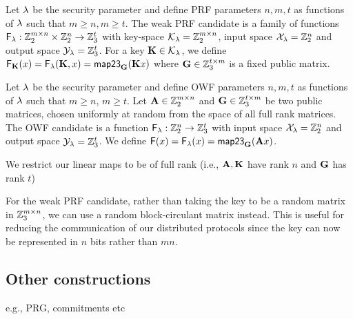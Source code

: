 \begin{construction}
Let $\lambda$ be the security parameter and define PRF parameters $n, m, t$ as functions of $\lambda$ such that $m \geq n, m \geq t$. The weak PRF candidate is a family of functions $\mathsf{F}_\lambda : \mathbb{Z}_2^{m \times n} \times \mathbb{Z}_2^n \to \mathbb{Z}_3^t$ with key-space $\mathcal{K}_\lambda = \mathbb{Z}_2^{m \times n}$, input space $\mathcal{X}_\lambda = \mathbb{Z}_2^n$ and output space $\mathcal{Y}_\lambda = \mathbb{Z}_3^t$. For a key $\mat{K} \in \keyspace_\secparam$, we define $\sfF_{\mat{K}}(x) = \PRFfunc(\mat{K}, x) = \map{\mat{G}}(\mat{K}x)$ where $\mat{G} \in \Z_3^{t \times m}$ is a fixed public matrix.
\label{construction:23-central-wprf}
\end{construction}

\begin{construction}
Let $\lambda$ be the security parameter and define OWF parameters $n, m, t$ as functions of $\lambda$ such that $m \geq n$, $m \geq t$. Let $\mat{A} \in \Z_2^{m \times n}$ and $\mat{G} \in \Z_3^{t \times m}$ be two public matrices, chosen uniformly at random from the space of all full rank matrices. The OWF candidate is a function $\mathsf{F}_\lambda : \mathbb{Z}_2^n \to \mathbb{Z}_3^t$ with input space $\mathcal{X}_\lambda = \mathbb{Z}_2^n$ and output space $\mathcal{Y}_\lambda = \mathbb{Z}_3^t$. We define $\sfF(x) = \OWFfunc(x) = \map{\mat{G}}(\mat{A}x)$.
\label{construction:23-owf}
\end{construction}

\begin{remark}
We restrict our linear maps to be of full rank (i.e., $\mat{A}, \mat{K}$ have rank $n$ and $\mat{G}$ has rank $t$)
\end{remark}

\begin{remark}
For the weak PRF candidate, rather than taking the key to be a random matrix in $\mathbb{Z}_3^{m \times n}$, we can use a random block-circulant matrix instead. This is useful for reducing the communication of our distributed protocols since the key can now be represented in $n$ bits rather than $mn$.
\end{remark}






\subsection{Other constructions}
e.g., PRG, commitments etc